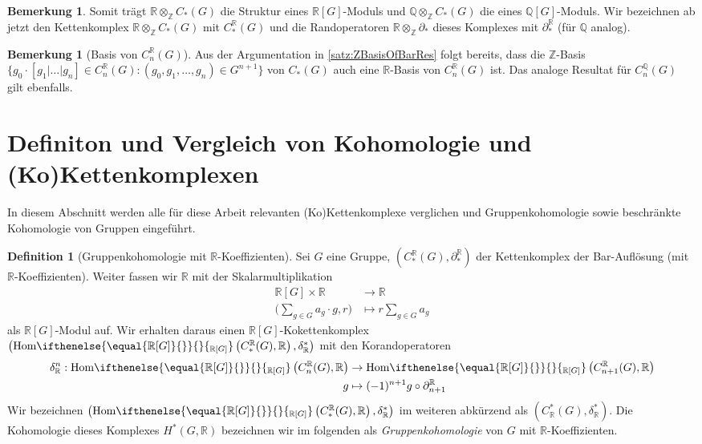 \documentclass[a4paper,twoside,10pt]{scrreprt}
\newcommand{\Z}{\mathbb{Z}}
\newcommand{\Q}{\mathbb{Q}}
\newcommand{\R}{\mathbb{R}}
\newcommand{\Hom}[2][]{\text{Hom}%
\ifthenelse{\equal{#1}{}}{}{_{#1}}%
\left(#2\right)}%
\theoremstyle{definition}
\newtheorem{definition}[satz]{Definition}
\newtheorem{bemerkung}[satz]{Bemerkung}
\begin{document}
\begin{bemerkung} Somit trägt $\R\otimes_{\Z}C_*(G)$ die Struktur eines $\R[G]$-Moduls und $\Q\otimes_{\Z}C_*(G)$ die eines $\Q[G]$-Moduls. Wir bezeichnen ab jetzt den Kettenkomplex $\R\otimes_{\Z}C_*(G)$ mit $C^{\R}_*(G)$ und die Randoperatoren $\R\otimes_{\Z}\partial_*$ dieses Komplexes mit $\partial_*^{\R}$ (für $\Q$ analog).
\end{bemerkung}

\begin{bemerkung}[Basis von $C_n^{\R}(G)$]\label{bem:RBasisOfBarRes}
Aus der Argumentation in \cref{satz:ZBasisOfBarRes} folgt bereits, dass die $\Z$-Basis $\{g_0\cdot [g_1|\ldots|g_n]\in C_n^{\R}(G):(g_0,g_1,\ldots,g_n)\in G^{n+1}\}$ von $C_*(G)$ auch eine $\R$-Basis von $C_n^{\R}(G)$ ist. Das analoge Resultat für $C_n^{\Q}(G)$ gilt ebenfalls.
\end{bemerkung}

\section{Definiton und Vergleich von Kohomologie und (Ko)Kettenkomplexen}
In diesem Abschnitt werden alle für diese Arbeit relevanten (Ko)Kettenkomplexe verglichen und Gruppenkohomologie sowie beschränkte Kohomologie von Gruppen eingeführt.
\begin{definition}[Gruppenkohomologie mit $\R$-Koeffizienten]
Sei $G$ eine Gruppe, $\left(C_*^{\R}(G),\partial_*^{\R}\right)$ der Kettenkomplex der Bar-Auflösung (mit $\R$-Koeffizienten). 
Weiter fassen wir $\R$ mit der Skalarmultiplikation
\begin{align*}
\R[G]\times \R&\to \R\\
\biggl(\sum\limits_{g\in G}a_g\cdot g,r\biggr)&\mapsto r\sum\limits_{g\in G} a_g
\end{align*} 
als $\R[G]$-Modul auf.
Wir erhalten daraus einen $\R[G]$-Kokettenkomplex \\$\left(\Hom[\R{[}G{]}]{C_*^{\R}(G),\R},\delta_{\R}^*\right)$ mit den Korandoperatoren
\begin{align*}
\delta_{\R}^n:\Hom[\R{[}G{]}]{C_n^{\R}(G),\R}&\to \Hom[\R{[}G{]}]{C_{n+1}^{\R}(G),\R}\\
g&\mapsto (-1)^{n+1}g\circ \partial_{n+1}^{\R}
\end{align*}
Wir bezeichnen $\left(\Hom[\R{[}G{]}]{C_*^{\R}(G),\R},\delta_{\R}^*\right)$ im weiteren abkürzend als $\left(C_{\R}^*(G),\delta_{\R}^*\right)$. Die Kohomologie dieses Komplexes $H^*(G,\R)$ bezeichnen wir im folgenden als \emph{Gruppenkohomologie} von $G$ mit $\R$-Koeffizienten.
\end{definition}
\end{document}
